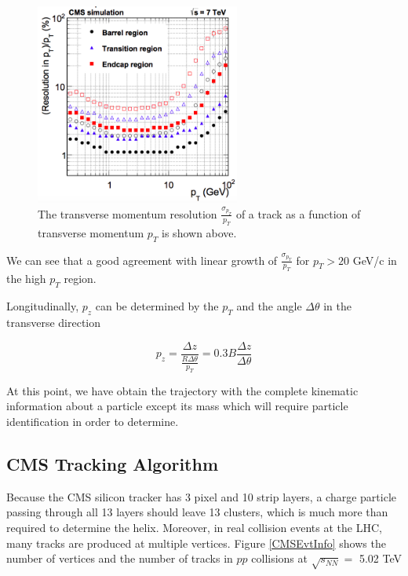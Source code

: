 \begin{figure}[hbtp]
\begin{center}
\includegraphics[width=0.60\textwidth]{Figures/Chapter3/CMSpTReso.png}
\caption{The transverse momentum resolution $\frac{\sigma_{p_T}}{p_T}$ of a track as a function of transverse momentum $p_T$ is shown above.}
\label{CMSpTReso}
\end{center}
\end{figure} 

We can see that a good agreement with linear growth of $\frac{\sigma_{p_T}}{p_T}$ for $p_T > 20$ GeV/c in the high $p_T$ region.

Longitudinally, $p_z$ can be determined by the $p_T$ and the angle $\Delta \theta$ in the transverse direction 

\begin{equation}
p_z = \frac{\Delta z}{\frac{R\Delta \theta}{p_T}} = 0.3B \frac{\Delta z}{\Delta \theta}
\end{equation}

At this point, we have obtain the trajectory with the complete kinematic information about a particle except its mass which will require particle identification in order to determine.

\subsection{CMS Tracking Algorithm}


Because the CMS silicon tracker has 3 pixel and 10 strip layers, a charge particle passing through all 13 layers should leave 13 clusters, which is much more than required to determine the helix. Moreover, in real collision events at the LHC, many tracks are produced at multiple vertices. Figure \ref{CMSEvtInfo} shows the number of vertices and the number of tracks in $pp$ collisions at $\sqrt{s_{NN}} = $ 5.02 TeV

